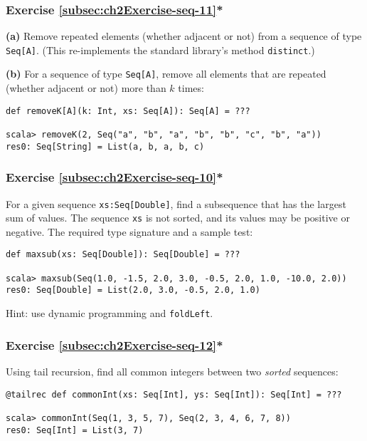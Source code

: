 \subsubsection{Exercise \label{subsec:ch2Exercise-seq-11}\ref{subsec:ch2Exercise-seq-11}{*}}

\textbf{(a)} Remove repeated elements (whether adjacent or not) from
a sequence of type \lstinline!Seq[A]!. (This re-implements the standard
library\textsf{'}s method \lstinline!distinct!.)

\textbf{(b)} For a sequence of type \lstinline!Seq[A]!, remove all
elements that are repeated (whether adjacent or not) more than $k$
times:
\begin{lstlisting}
def removeK[A](k: Int, xs: Seq[A]): Seq[A] = ???

scala> removeK(2, Seq("a", "b", "a", "b", "b", "c", "b", "a"))
res0: Seq[String] = List(a, b, a, b, c)
\end{lstlisting}


\subsubsection{Exercise \label{subsec:ch2Exercise-seq-10}\ref{subsec:ch2Exercise-seq-10}{*}}

For a given sequence \lstinline!xs:Seq[Double]!, find a subsequence
that has the largest sum of values. The sequence \lstinline!xs! is
not sorted, and its values may be positive or negative. The required
type signature and a sample test:
\begin{lstlisting}
def maxsub(xs: Seq[Double]): Seq[Double] = ???

scala> maxsub(Seq(1.0, -1.5, 2.0, 3.0, -0.5, 2.0, 1.0, -10.0, 2.0))
res0: Seq[Double] = List(2.0, 3.0, -0.5, 2.0, 1.0)
\end{lstlisting}

Hint: use dynamic programming and \lstinline!foldLeft!.

\subsubsection{Exercise \label{subsec:ch2Exercise-seq-12}\ref{subsec:ch2Exercise-seq-12}{*}}

Using tail recursion, find all common integers between two \emph{sorted}
sequences:
\begin{lstlisting}
@tailrec def commonInt(xs: Seq[Int], ys: Seq[Int]): Seq[Int] = ???

scala> commonInt(Seq(1, 3, 5, 7), Seq(2, 3, 4, 6, 7, 8))
res0: Seq[Int] = List(3, 7)
\end{lstlisting}


